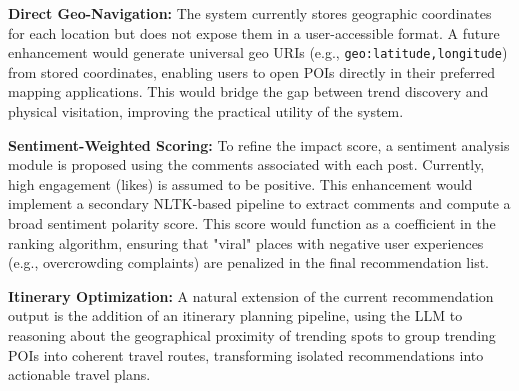 \documentclass[a4paper,12pt]{report}
\begin{document}
\textbf{Direct Geo-Navigation:} The system currently stores geographic coordinates for each location but does not expose them in a user-accessible format. A future enhancement would generate universal geo URIs (e.g., \texttt{geo:latitude,longitude}) from stored coordinates, enabling users to open POIs directly in their preferred mapping applications. This would bridge the gap between trend discovery and physical visitation, improving the practical utility of the system.

\textbf{Sentiment-Weighted Scoring:} To refine the impact score, a sentiment analysis module is proposed using the comments associated with each post. Currently, high engagement (likes) is assumed to be positive. This enhancement would implement a secondary NLTK-based pipeline to extract comments and compute a broad sentiment polarity score. This score would function as a coefficient in the ranking algorithm, ensuring that "viral" places with negative user experiences (e.g., overcrowding complaints) are penalized in the final recommendation list.

\textbf{Itinerary Optimization:} A natural extension of the current recommendation output is the addition of an itinerary planning pipeline, using the LLM to reasoning about the geographical proximity of trending spots to group trending POIs into coherent travel routes, transforming isolated recommendations into actionable travel plans.


\printbibliography
\end{document}
